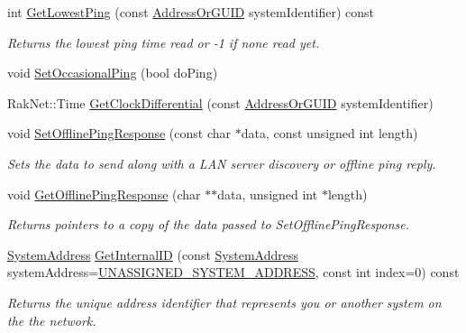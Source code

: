 \begin{DoxyCompactItemize}
int \hyperlink{class_rak_net_1_1_rak_peer_afdb8673a54a5f3926ac93e13a4a20367}{Get\-Lowest\-Ping} (const \hyperlink{struct_rak_net_1_1_address_or_g_u_i_d}{Address\-Or\-G\-U\-I\-D} system\-Identifier) const 
\begin{DoxyCompactList}\small\item\em Returns the lowest ping time read or -\/1 if none read yet. \end{DoxyCompactList}\item 
void \hyperlink{class_rak_net_1_1_rak_peer_abb8d47e41f9bc523a555d8f1bc774e4a}{Set\-Occasional\-Ping} (bool do\-Ping)
\item 
Rak\-Net\-::\-Time \hyperlink{class_rak_net_1_1_rak_peer_ac1f87a029e47963ae24838ec87c1a076}{Get\-Clock\-Differential} (const \hyperlink{struct_rak_net_1_1_address_or_g_u_i_d}{Address\-Or\-G\-U\-I\-D} system\-Identifier)
\item 
void \hyperlink{class_rak_net_1_1_rak_peer_a2a534f1c0bb56b3c5b9b56ca8839917c}{Set\-Offline\-Ping\-Response} (const char $\ast$data, const unsigned int length)
\begin{DoxyCompactList}\small\item\em Sets the data to send along with a L\-A\-N server discovery or offline ping reply. \end{DoxyCompactList}\item 
void \hyperlink{class_rak_net_1_1_rak_peer_aec33659d51a00eed12bd1dc8a24071b0}{Get\-Offline\-Ping\-Response} (char $\ast$$\ast$data, unsigned int $\ast$length)
\begin{DoxyCompactList}\small\item\em Returns pointers to a copy of the {\itshape data} passed to Set\-Offline\-Ping\-Response. \end{DoxyCompactList}\item 
\hyperlink{struct_rak_net_1_1_system_address}{System\-Address} \hyperlink{class_rak_net_1_1_rak_peer_acf82a248aa543c9ec04567c14004fea5}{Get\-Internal\-I\-D} (const \hyperlink{struct_rak_net_1_1_system_address}{System\-Address} system\-Address=\hyperlink{namespace_rak_net_a80c95b4ed53f42911a6fa92b85e929cf}{U\-N\-A\-S\-S\-I\-G\-N\-E\-D\-\_\-\-S\-Y\-S\-T\-E\-M\-\_\-\-A\-D\-D\-R\-E\-S\-S}, const int index=0) const 
\begin{DoxyCompactList}\small\item\em Returns the unique address identifier that represents you or another system on the the network. \end{DoxyCompactList}\item 
$$
\end{DoxyCompactItemize}
